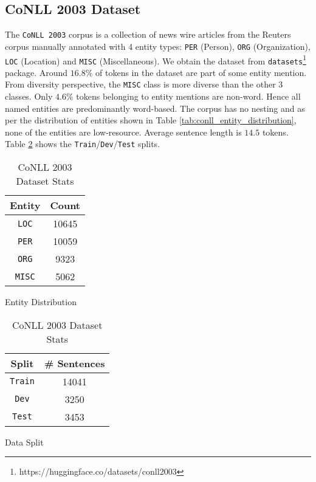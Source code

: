 \subsection{CoNLL 2003 Dataset}

The \texttt{CoNLL 2003}\cite{sang2003introduction} corpus is a collection of news wire articles from the Reuters corpus manually annotated with 4 entity types: \texttt{PER} (Person), \texttt{ORG} (Organization), \texttt{LOC} (Location) and \texttt{MISC} (Miscellaneous). We obtain the dataset from \texttt{datasets}\footnote{https://huggingface.co/datasets/conll2003} package. Around $16.8\%$ of tokens in the dataset are part of some entity mention. From diversity perspective, the \texttt{MISC} class is more diverse than the other 3 classes. Only $4.6\%$ tokens belonging to entity mentions are non-word. Hence all named entities are predominantly word-based. The corpus has no nesting and as per the distribution of entities shown in Table \ref{tab:conll_entity_distribution}, none of the entities are low-resource. Average sentence length is $14.5$ tokens. Table \ref{tab:conll_dataset_split} shows the \texttt{Train}/\texttt{Dev}/\texttt{Test} splits. 

\begin{table}[h!]
\begin{subtable}[t]{.48\linewidth}
\centering
\begin{tabular}{|c|c|}\hline
	\textbf{Entity} & \textbf{Count}\\\hline
	\texttt{LOC} & 10645\\\hline
	\texttt{PER} & 10059\\\hline
	\texttt{ORG} & 9323\\\hline
	\texttt{MISC} & 5062\\\hline
	\end{tabular}
	\caption{Entity Distribution}
	\label{tab:conll_entity_distribution}
\end{subtable}
\begin{subtable}[t]{.48\linewidth}
\centering
\begin{tabular}{|c|c|}\hline
	\textbf{Split} & \textbf{\# Sentences}\\\hline
	\texttt{Train} & 14041\\\hline
	\texttt{Dev} & 3250\\\hline
	\texttt{Test} & 3453\\\hline
	\end{tabular}
	\caption{Data Split}
	\label{tab:conll_dataset_split}
\end{subtable}
\caption{CoNLL 2003 Dataset Stats}
\end{table}


